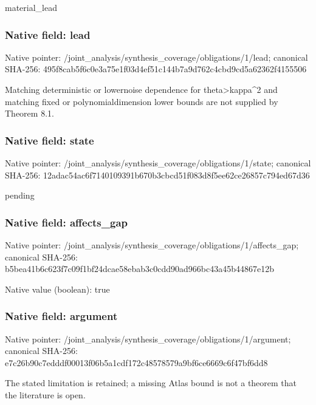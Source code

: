 \documentclass[10pt,a4paper]{article}
\begin{document}
material\_lead


\subsubsection{Native field: lead}


Native pointer: /joint\_analysis/synthesi\allowbreak{}s\_coverage/obligations/1\allowbreak{}/lead; canonical SHA-256: 495f8cab5f6c0e3a75e1f03d\allowbreak{}4ef51c144b7a9d762c4cbd9c\allowbreak{}d5a62362f4155506


Matching deterministic or lowernoise dependence for theta>kappa\textasciicircum{}2 and matching fixed or polynomialdimension lower bounds are not supplied by Theorem 8.1.


\subsubsection{Native field: state}


Native pointer: /joint\_analysis/synthesi\allowbreak{}s\_coverage/obligations/1\allowbreak{}/state; canonical SHA-256: 12adac54ac6f7140109391b6\allowbreak{}70b3cbcd51f083d8f5ee62ce\allowbreak{}26857c794ed67d36


pending


\subsubsection{Native field: affects\_gap}


Native pointer: /joint\_analysis/synthesi\allowbreak{}s\_coverage/obligations/1\allowbreak{}/affects\_gap; canonical SHA-256: b5bea41b6c623f7c09f1bf24\allowbreak{}dcae58ebab3c0cdd90ad966b\allowbreak{}c43a45b44867e12b



Native value (boolean): true



\subsubsection{Native field: argument}


Native pointer: /joint\_analysis/synthesi\allowbreak{}s\_coverage/obligations/1\allowbreak{}/argument; canonical SHA-256: e7c26b90c7edddf00013f06b\allowbreak{}5a1cdf172c48578579a9bf6c\allowbreak{}e6669c6f47bf6dd8


The stated limitation is retained; a missing Atlas bound is not a theorem that the literature is open.
\end{document}
